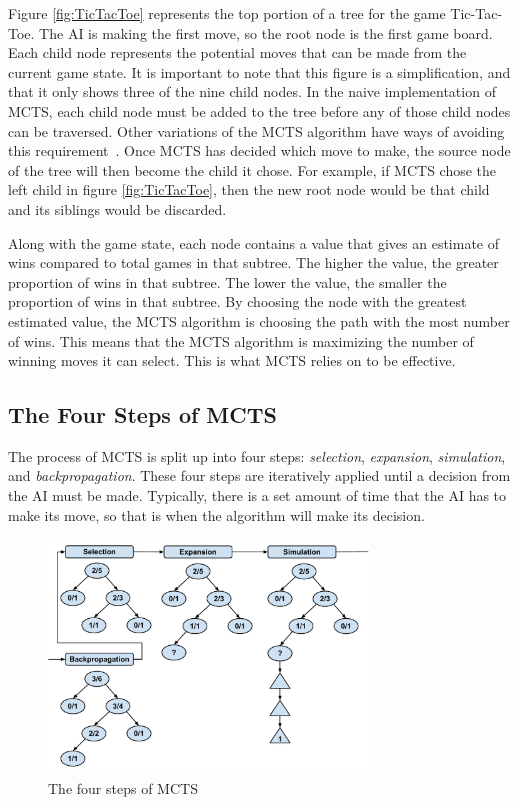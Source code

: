\documentclass{sig-alternate}
\begin{document}
Figure \ref{fig:TicTacToe} represents the top portion of a tree for the game Tic-Tac-Toe. The AI is making the first move, so the root node is the first game board. Each child node represents the potential moves that can be made from the current game state. It is important to note that this figure is a simplification, and that it only shows three of the nine child nodes. In the naive implementation of MCTS, each child node must be added to the tree before any of those child nodes can be traversed. Other variations of the MCTS algorithm have ways of avoiding this requirement~\cite{ActionSelection}. Once MCTS has decided which move to make, the source node of the tree will then become the child it chose. For example, if MCTS chose the left child in figure \ref{fig:TicTacToe}, then the new root node would be that child and its siblings would be discarded.

Along with the game state, each node contains a value that gives an estimate of wins compared to total games in that subtree. The higher the value, the greater proportion of wins in that subtree. The lower the value, the smaller the proportion of wins in that subtree. By choosing the node with the greatest estimated value, the MCTS algorithm is choosing the path with the most number of wins. This means that the MCTS algorithm is maximizing the number of winning moves it can select. This is what MCTS relies on to be effective.

\subsection{The Four Steps of MCTS}
The process of MCTS is split up into four steps: \textit{selection}, \textit{expansion}, \textit{simulation}, and \textit{backpropagation}. These four steps are iteratively applied until a decision from the AI must be made. Typically, there is a set amount of time that the AI has to make its move, so that is when the algorithm will make its decision.

\begin{figure}[h]
	\includegraphics[width=8.5cm]{MCTSFourStepProcess.pdf}
	\centering
	\caption{The four steps of MCTS}
	\label{fig:FourSteps}
\end{figure}
\end{document}
